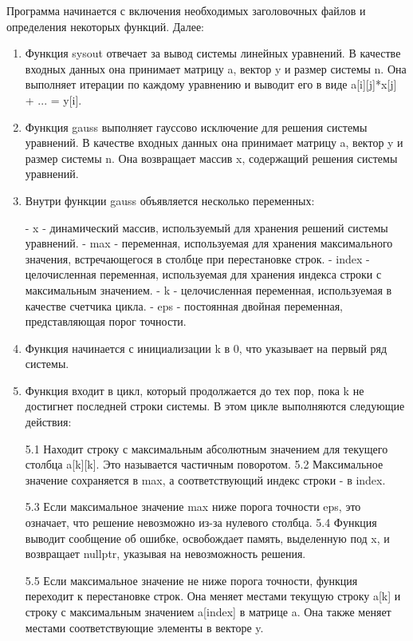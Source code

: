\documentclass[12pt,a4paper]{scrartcl}
\begin{document}
Программа начинается с включения необходимых заголовочных файлов и определения некоторых функций.
Далее:
\begin{enumerate}
    \item Функция sysout отвечает за вывод системы линейных уравнений. В качестве входных данных она принимает матрицу a, вектор y и размер системы n. Она выполняет итерации по каждому уравнению и выводит его в виде a[i][j]*x[j] + ... = y[i].

    \item Функция gauss выполняет гауссово исключение для решения системы уравнений. В качестве входных данных она принимает матрицу a, вектор y и размер системы n. Она возвращает массив x, содержащий решения системы уравнений.

    \item Внутри функции gauss объявляется несколько переменных:

- x - динамический массив, используемый для хранения решений системы уравнений.
- max - переменная, используемая для хранения максимального значения, встречающегося в столбце при перестановке строк.
- index - целочисленная переменная, используемая для хранения индекса строки с максимальным значением.
- k - целочисленная переменная, используемая в качестве счетчика цикла.
- eps - постоянная двойная переменная, представляющая порог точности.

    \item Функция начинается с инициализации k в 0, что указывает на первый ряд системы.

    \item Функция входит в цикл, который продолжается до тех пор, пока k не достигнет последней строки системы. В этом цикле выполняются следующие действия:

5.1 Находит строку с максимальным абсолютным значением для текущего столбца a[k][k]. Это называется частичным поворотом. 
5.2 Максимальное значение сохраняется в max, а соответствующий индекс строки - в index.

5.3 Если максимальное значение max ниже порога точности eps, это означает, что решение невозможно из-за нулевого столбца. 
5.4 Функция выводит сообщение об ошибке, освобождает память, выделенную под x, и возвращает nullptr, указывая на невозможность решения.

5.5 Если максимальное значение не ниже порога точности, функция переходит к перестановке строк. Она меняет местами текущую строку a[k] и строку с максимальным значением a[index] в матрице a. Она также меняет местами соответствующие элементы в векторе y.


\end{enumerate}
\end{document}
